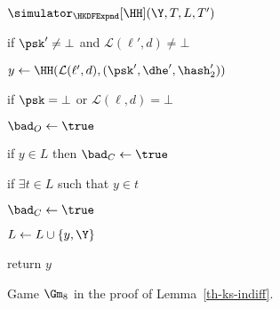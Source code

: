 \begin{figure}[tp]
\begin{minipage}[t]{0.49\textwidth}
\begin{oracle}{$\simulator_{\HKDFExpnd}[\HH](\Y, T, L, T')$}
			\item \quad if $\psk' \neq \bot$ and $\mathcal{L}(\ell', d) \neq \bot$ 
			\item \quad \quad $y \gets \HH(\mathcal{L} (\ell', d), (\psk', \dhe',\hash'_2))$
			\item \quad \quad if $\psk = \bot$ or $\mathcal{L}(\ell, d) =\bot$
			\item \quad \quad \quad $\bad_O \gets \true$
			\item if $y \in L$ then $\bad_C \gets \true$
			\item if $\exists t \in L$ such that $y \in t$
			\item \quad $\bad_C \gets \true$
			\item $ L \gets L \cup \{y, \Y\}$
			\item return $y$
		\end{oracle}
	\end{minipage}
	\label{fig:gm8-ks-indiff}
	\caption{ Game $\Gm_8$ in the proof of Lemma~\ref{th-ks-indiff}.}
\end{figure}
